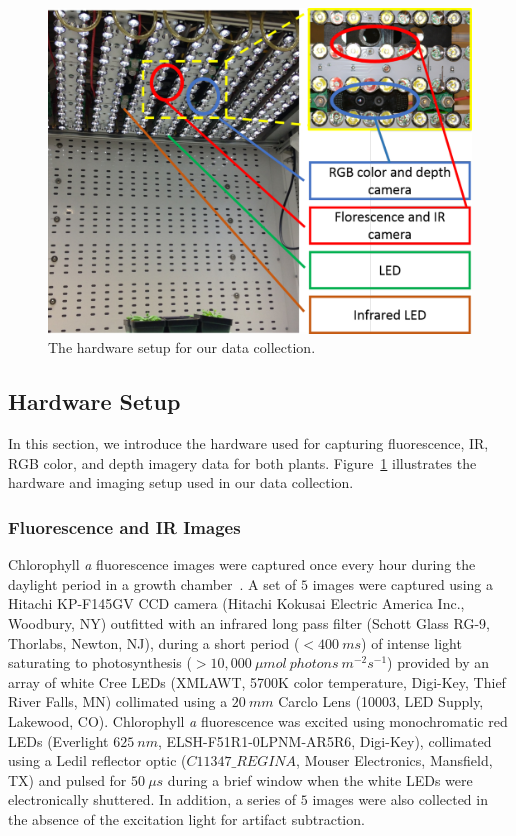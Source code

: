 \begin{figure}
  \includegraphics[width=\linewidth,trim=55 100 200 70,clip]{Figures/hardware}
\caption{The hardware setup for our data collection.}
\label{fig:hardware}
\end{figure}

\subsection{Hardware Setup}

In this section, we introduce the hardware used for capturing fluorescence, IR, RGB color, and depth imagery data for both plants.
Figure~\ref{fig:hardware} illustrates the hardware and imaging setup used in our data collection.

\subsubsection{Fluorescence and IR Images}
Chlorophyll {\it a} fluorescence images were captured once every hour during the daylight period in a growth chamber~\cite{cruz2015depi}.
A set of $5$ images were captured using a Hitachi KP-F145GV CCD camera (Hitachi Kokusai Electric America Inc., Woodbury, NY) outfitted with an infrared long pass filter (Schott Glass RG-9, Thorlabs, Newton, NJ), during a short period ($<400~ms$) of intense light saturating to photosynthesis ($>10,000~\mu mol~photons~m^{-2} s^{-1}$) provided by an array of white Cree LEDs (XMLAWT, 5700K color temperature, Digi-Key, Thief River Falls, MN) collimated using a $20~mm$ Carclo Lens (10003, LED Supply, Lakewood, CO).
%
Chlorophyll {\it a} fluorescence was excited using monochromatic red LEDs (Everlight $625~nm$, ELSH-F51R1-0LPNM-AR5R6, Digi-Key), collimated using a Ledil reflector optic ($C11347\_REGINA$, Mouser Electronics, Mansfield, TX) and pulsed for $50~\mu s$ during a brief window when the white LEDs were electronically shuttered.
In addition, a series of $5$ images were also collected in the absence of the excitation light for artifact subtraction.

